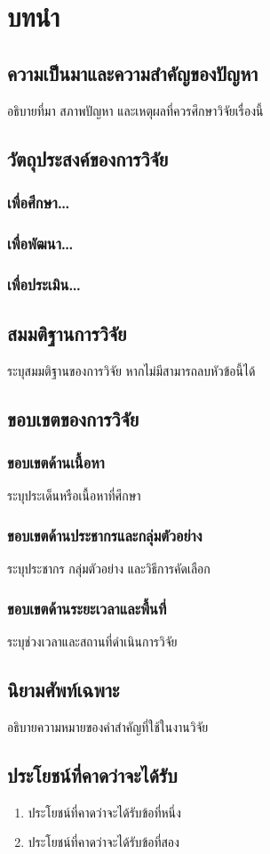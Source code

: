 \chapter{บทนำ}
\section{ความเป็นมาและความสำคัญของปัญหา}
อธิบายที่มา สภาพปัญหา และเหตุผลที่ควรศึกษาวิจัยเรื่องนี้

\section{วัตถุประสงค์ของการวิจัย}
\subsection{เพื่อศึกษา\ldots}
\subsection{เพื่อพัฒนา\ldots}
\subsection{เพื่อประเมิน\ldots}
\vspace{16pt}

\section{สมมติฐานการวิจัย}
ระบุสมมติฐานของการวิจัย หากไม่มีสามารถลบหัวข้อนี้ได้

\section{ขอบเขตของการวิจัย}
\subsection{ขอบเขตด้านเนื้อหา}
ระบุประเด็นหรือเนื้อหาที่ศึกษา
\subsection{ขอบเขตด้านประชากรและกลุ่มตัวอย่าง}
ระบุประชากร กลุ่มตัวอย่าง และวิธีการคัดเลือก
\subsection{ขอบเขตด้านระยะเวลาและพื้นที่}
ระบุช่วงเวลาและสถานที่ดำเนินการวิจัย

\section{นิยามศัพท์เฉพาะ}
อธิบายความหมายของคำสำคัญที่ใช้ในงานวิจัย

\section{ประโยชน์ที่คาดว่าจะได้รับ}
\begin{enumerate}
  \item ประโยชน์ที่คาดว่าจะได้รับข้อที่หนึ่ง
  \item ประโยชน์ที่คาดว่าจะได้รับข้อที่สอง
\end{enumerate}

